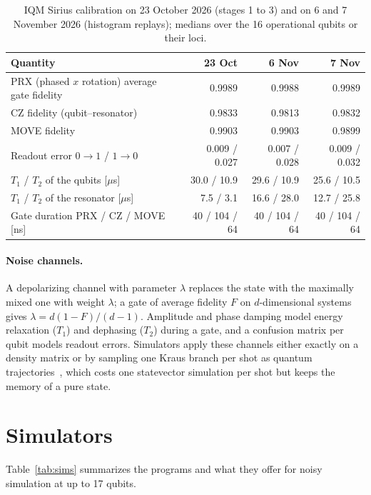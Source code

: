 \documentclass{scspaperproc}
\begin{document}
\begin{table}[t]
\caption{IQM Sirius calibration on 23 October 2026 (stages 1 to 3) and on
6 and 7 November 2026 (histogram replays); medians over the 16 operational
qubits or their loci.}
\label{tab:calib}
\centering
\small
\begin{tabular}{lrrr}
\toprule
Quantity & 23 Oct & 6 Nov & 7 Nov \\
\midrule
PRX (phased $x$ rotation) average gate fidelity & 0.9989 & 0.9988 & 0.9989 \\
CZ fidelity (qubit--resonator) & 0.9833 & 0.9813 & 0.9832 \\
MOVE fidelity & 0.9903 & 0.9903 & 0.9899 \\
Readout error $0\!\to\!1$ / $1\!\to\!0$ & 0.009 / 0.027 & 0.007 / 0.028 & 0.009 / 0.032 \\
$T_1$ / $T_2$ of the qubits [$\mu$s] & 30.0 / 10.9 & 29.6 / 10.9 & 25.6 / 10.5 \\
$T_1$ / $T_2$ of the resonator [$\mu$s] & 7.5 / 3.1 & 16.6 / 28.0 & 12.7 / 25.8 \\
Gate duration PRX / CZ / MOVE [ns] & 40 / 104 / 64 & 40 / 104 / 64 & 40 / 104 / 64 \\
\bottomrule
\end{tabular}
\end{table}

\paragraph{Noise channels.}
A depolarizing channel with parameter $\lambda$ replaces the state with the
maximally mixed one with weight $\lambda$; a gate of average fidelity $F$ on
$d$-dimensional systems gives $\lambda = d(1 - F)/(d - 1)$. Amplitude and phase
damping model energy relaxation ($T_1$) and dephasing ($T_2$) during a gate, and
a confusion matrix per qubit models readout errors. Simulators apply these
channels either exactly on a density matrix or by sampling one Kraus branch
per shot as quantum trajectories~\cite{dalibard1992mcwf}, which costs one
statevector simulation per shot but keeps the memory of a pure state.

\section{Simulators}

Table~\ref{tab:sims} summarizes the programs and what they offer for noisy
simulation at up to 17 qubits.
\end{document}
